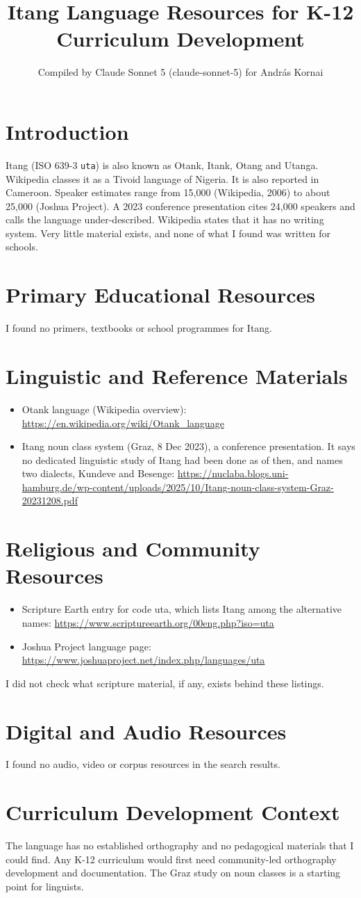 \documentclass[12pt]{article}
\title{Itang Language Resources for K-12 Curriculum Development}
\author{Compiled by Claude Sonnet 5 (claude-sonnet-5) for Andr\'as Kornai}
\date{}
\begin{document}
\maketitle
\section{Introduction}
Itang (ISO 639-3 \texttt{uta}) is also known as Otank, Itank, Otang and Utanga. Wikipedia classes it as a Tivoid language of Nigeria. It is also reported in Cameroon. Speaker estimates range from 15,000 (Wikipedia, 2006) to about 25,000 (Joshua Project). A 2023 conference presentation cites 24,000 speakers and calls the language under-described. Wikipedia states that it has no writing system. Very little material exists, and none of what I found was written for schools.
\section{Primary Educational Resources}
I found no primers, textbooks or school programmes for Itang.
\section{Linguistic and Reference Materials}
\begin{itemize}
\item Otank language (Wikipedia overview): \url{https://en.wikipedia.org/wiki/Otank_language}
\item Itang noun class system (Graz, 8 Dec 2023), a conference presentation. It says no dedicated linguistic study of Itang had been done as of then, and names two dialects, Kundeve and Besenge: \url{https://nuclaba.blogs.uni-hamburg.de/wp-content/uploads/2025/10/Itang-noun-class-system-Graz-20231208.pdf}
\end{itemize}
\section{Religious and Community Resources}
\begin{itemize}
\item Scripture Earth entry for code uta, which lists Itang among the alternative names: \url{https://www.scriptureearth.org/00eng.php?iso=uta}
\item Joshua Project language page: \url{https://www.joshuaproject.net/index.php/languages/uta}
\end{itemize}
I did not check what scripture material, if any, exists behind these listings.
\section{Digital and Audio Resources}
I found no audio, video or corpus resources in the search results.
\section{Curriculum Development Context}
The language has no established orthography and no pedagogical materials that I could find. Any K-12 curriculum would first need community-led orthography development and documentation. The Graz study on noun classes is a starting point for linguists.
\end{document}

